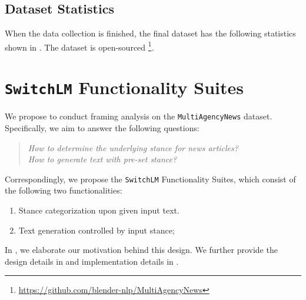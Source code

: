 \subsection{Dataset Statistics}
\label{dataset-stats}
When the data collection is finished, the final dataset has the following statistics shown in . The dataset is open-sourced \footnote{\url{https://github.com/blender-nlp/MultiAgencyNews}}.
\begin{table}[h]
    \centering
    \caption{The Statistics of the Collected Dataset}
    \label{tab:dataset-stat}
\end{table}


\section{\texttt{SwitchLM} Functionality Suites}
\label{switchlm}
We propose to conduct framing analysis on the \texttt{MultiAgencyNews} dataset. Specifically, we aim to answer the following questions:
\begin{quote}
    \textit{How to determine the underlying stance for news articles?} \\
    \textit{How to generate text with pre-set stance?}
\end{quote}
Correspondingly, we propose the \texttt{SwitchLM} Functionality Suites, which consist of the following two functionalities:
\begin{enumerate}
    \item Stance categorization upon given input text.
    \item Text generation controlled by input stance;
\end{enumerate}
In , we elaborate our motivation behind this design. We further provide the design details in  and implementation details in .

